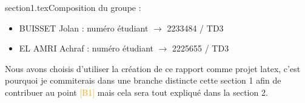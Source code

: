 section1.texComposition du groupe :
\begin{itemize}
    \item BUISSET Jolan : numéro étudiant $\rightarrow$ 2233484 / TD3
    \item EL AMRI Achraf : numéro étudiant $\rightarrow$ 2225655 / TD3
\end{itemize}
Nous avons choisis d'utiliser la création de ce rapport comme projet latex, c'est pourquoi je commiterais dans une branche distincte cette section 1 afin de contribuer au point \textcolor{orange}{[B1]} mais cela sera tout expliqué dans la section 2.
